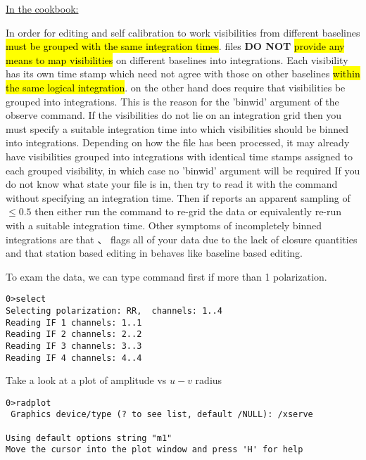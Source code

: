 \documentclass[a4paper,11pt]{article}
\begin{document}
\normalsize
\par \ul{In the cookbook:}
\par In order for editing and self calibration to work visibilities from different baselines \hl{must be grouped with the same integration times}.
 files \textbf{DO NOT} \hl{provide any means to map visibilities} on different baselines into integrations. Each visibility has its own time stamp which need not agree with those on other baselines \hl{within the same logical integration}.  on the other hand does require that visibilities be grouped into integrations. This is the reason for the 'binwid' argument of the observe command. If the visibilities do not lie on an integration grid then you must specify a suitable integration time into which visibilities should be binned into integrations. Depending on how the  file has been processed, it may already have visibilities grouped into integrations with identical time stamps assigned to each grouped visibility, in which case no 'binwid' argument will be required If you do not know what state your file is in, then try to read it with the  command without specifying an integration time. Then if  reports an apparent sampling of $\leq0.5$ then either run the  command to re-grid the data or equivalently re-run  with a suitable integration time. Other symptoms of incompletely binned integrations are that 、 flags all of your data due to the lack of closure quantities and that station based editing in  behaves like baseline based editing.

\par To exam the data, we can type command  first if more than 1 polarization.
\begin{lstlisting}
0>select 
Selecting polarization: RR,  channels: 1..4
Reading IF 1 channels: 1..1
Reading IF 2 channels: 2..2
Reading IF 3 channels: 3..3
Reading IF 4 channels: 4..4
\end{lstlisting}
Take a look at a plot of amplitude vs $u-v$ radius
\scriptsize
\begin{lstlisting}
0>radplot
 Graphics device/type (? to see list, default /NULL): /xserve

Using default options string "m1"
Move the cursor into the plot window and press 'H' for help
\end{lstlisting}
\end{document}
